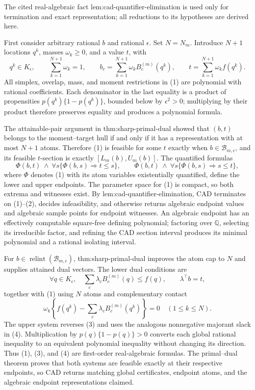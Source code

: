 The cited real-algebraic fact lem:cad-quantifier-elimination is used only for termination and exact representation; all reductions to its hypotheses are derived here.

First consider arbitrary rational \(b\) and rational \(\epsilon\).  Set \(N=N_m\).  Introduce \(N+1\) locations \(q^k\), masses \(\omega_k\geq0\), and a value \(t\), with
\[
 q^k\in K_{\epsilon},\qquad
 \sum_{k=1}^{N+1}\omega_k=1,
 \qquad
 b_c=\sum_{k=1}^{N+1}\omega_kB_c^{(m)}(q^k),
 \qquad
 t=\sum_{k=1}^{N+1}\omega_k f(q^k).
\tag{1}
\]
All simplex, overlap, mass, and moment restrictions in (1) are polynomial with rational coefficients.  Each denominator in the last equality is a product of propensities \(p(q^k)\{1-p(q^k)\}\), bounded below by \(\epsilon^2>0\); multiplying by their product therefore preserves equality and produces a polynomial formula.

The attainable-pair argument in thm:sharp-primal-dual showed that \((b,t)\) belongs to the moment--target hull if and only if it has a representation with at most \(N+1\) atoms.  Therefore (1) is feasible for some \(t\) exactly when \(b\in\mathcal B_{m,\epsilon}\), and its feasible \(t\)-section is exactly \([L_m(b),U_m(b)]\).  The quantified formulas
\[
 \Phi(b,t)\ \wedge\ \forall s\{\Phi(b,s)\Rightarrow t\leq s\},
 \qquad
 \Phi(b,t)\ \wedge\ \forall s\{\Phi(b,s)\Rightarrow s\leq t\},
\tag{2}
\]
where \(\Phi\) denotes (1) with its atom variables existentially quantified, define the lower and upper endpoints.  The parameter space for (1) is compact, so both extrema and witnesses exist.  By lem:cad-quantifier-elimination, CAD terminates on (1)--(2), decides infeasibility, and otherwise returns algebraic endpoint values and algebraic sample points for endpoint witnesses.  An algebraic endpoint has an effectively computable square-free defining polynomial; factoring over \(\mathbb Q\), selecting its irreducible factor, and refining the CAD section interval produces its minimal polynomial and a rational isolating interval.

For \(b\in\operatorname{relint}(\mathcal B_{m,\epsilon})\), thm:sharp-primal-dual improves the atom cap to \(N\) and supplies attained dual vectors.  The lower dual conditions are
\[
 \forall q\in K_{\epsilon},\quad
 \sum_c\lambda_cB_c^{(m)}(q)\leq f(q),
 \qquad
 \lambda^{\top}b=t,
\tag{3}
\]
together with (1) using \(N\) atoms and complementary contact
\[
 \omega_k\left\{f(q^k)-\sum_c\lambda_cB_c^{(m)}(q^k)\right\}=0
 \quad(1\leq k\leq N).
\tag{4}
\]
The upper system reverses (3) and uses the analogous nonnegative majorant slack in (4).  Multiplication by \(p(q)\{1-p(q)\}>0\) converts each global rational inequality to an equivalent polynomial inequality without changing its direction.  Thus (1), (3), and (4) are first-order real-algebraic formulas.  The primal--dual theorem proves that both systems are feasible exactly at their respective endpoints, so CAD returns matching global certificates, endpoint atoms, and the algebraic endpoint representations claimed.

